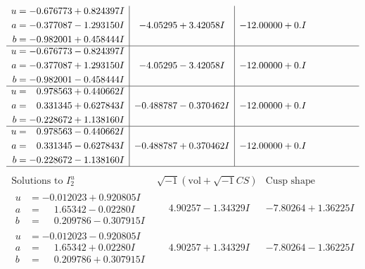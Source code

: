 \documentclass[1p]{elsarticle_modified}
\theoremstyle{definition}
\newcommand{\I}{\sqrt{-1}}
\begin{document}
$$\begin{array}{c|c|c}
\begin{aligned}
u &= -0.676773 + 0.824397 I \\
a &= -0.377087 - 1.293150 I \\
b &= -0.982001 + 0.458444 I\end{aligned}
 & -4.05295 + 3.42058 I & -12.00000 + 0. I\phantom{ +0.000000I} \\ \hline\begin{aligned}
u &= -0.676773 - 0.824397 I \\
a &= -0.377087 + 1.293150 I \\
b &= -0.982001 - 0.458444 I\end{aligned}
 & -4.05295 - 3.42058 I & -12.00000 + 0. I\phantom{ +0.000000I} \\ \hline\begin{aligned}
u &= \phantom{-}0.978563 + 0.440662 I \\
a &= \phantom{-}0.331345 + 0.627843 I \\
b &= -0.228672 + 1.138160 I\end{aligned}
 & -0.488787 - 0.370462 I & -12.00000 + 0. I\phantom{ +0.000000I} \\ \hline\begin{aligned}
u &= \phantom{-}0.978563 - 0.440662 I \\
a &= \phantom{-}0.331345 - 0.627843 I \\
b &= -0.228672 - 1.138160 I\end{aligned}
 & -0.488787 + 0.370462 I & -12.00000 + 0. I\phantom{ +0.000000I}\\
 \hline 
 \end{array}$$\newpage$$\begin{array}{c|c|c}  
\text{Solutions to }I^u_{2}& \I (\text{vol} + \sqrt{-1}CS) & \text{Cusp shape}\\
 \hline 
\begin{aligned}
u &= -0.012023 + 0.920805 I \\
a &= \phantom{-}1.65342 - 0.02280 I \\
b &= \phantom{-}0.209786 - 0.307915 I\end{aligned}
 & \phantom{-}4.90257 - 1.34329 I & -7.80264 + 1.36225 I \\ \hline\begin{aligned}
u &= -0.012023 - 0.920805 I \\
a &= \phantom{-}1.65342 + 0.02280 I \\
b &= \phantom{-}0.209786 + 0.307915 I\end{aligned}
 & \phantom{-}4.90257 + 1.34329 I & -7.80264 - 1.36225 I \\ \hline\begin{aligned}

\end{aligned}
\end{array}$$
\end{document}
